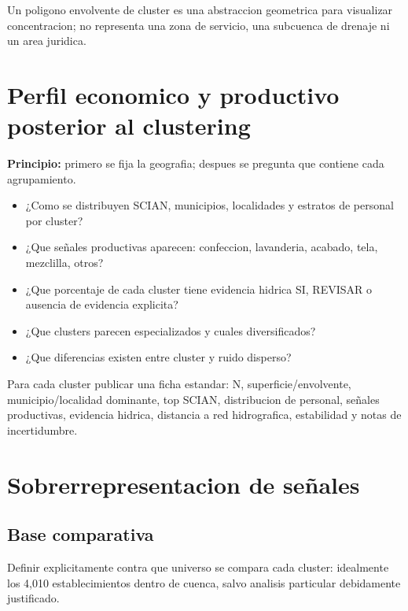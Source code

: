 \documentclass[11pt,letterpaper]{article}
\begin{document}
\begin{alerta}
Un poligono envolvente de cluster es una abstraccion geometrica para visualizar concentracion; no representa una zona de servicio, una subcuenca de drenaje ni un area juridica.
\end{alerta}

\section{Perfil economico y productivo posterior al clustering}

\textbf{Principio:} primero se fija la geografia; despues se pregunta que contiene cada agrupamiento.

\begin{preguntas}
\begin{itemize}
    \item ¿Como se distribuyen SCIAN, municipios, localidades y estratos de personal por cluster?
    \item ¿Que señales productivas aparecen: confeccion, lavanderia, acabado, tela, mezclilla, otros?
    \item ¿Que porcentaje de cada cluster tiene evidencia hidrica SI, REVISAR o ausencia de evidencia explicita?
    \item ¿Que clusters parecen especializados y cuales diversificados?
    \item ¿Que diferencias existen entre cluster y ruido disperso?
\end{itemize}
\end{preguntas}

\begin{evidencia}
Para cada cluster publicar una ficha estandar: N, superficie/envolvente, municipio/localidad dominante, top SCIAN, distribucion de personal, señales productivas, evidencia hidrica, distancia a red hidrografica, estabilidad y notas de incertidumbre.
\end{evidencia}

\section{Sobrerrepresentacion de señales}

\subsection{Base comparativa}
Definir explicitamente contra que universo se compara cada cluster: idealmente los 4,010 establecimientos dentro de cuenca, salvo analisis particular debidamente justificado.
\end{document}
